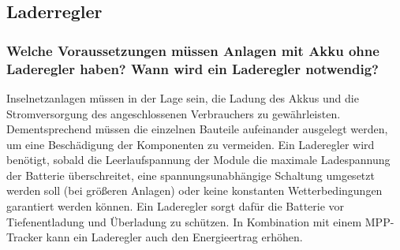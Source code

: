 \subsection{Laderregler}
\subsubsection{Welche Voraussetzungen müssen Anlagen mit Akku ohne Laderegler haben? Wann wird ein Laderegler notwendig?}
Inselnetzanlagen müssen in der Lage sein, die Ladung des Akkus und die Stromversorgung des angeschlossenen Verbrauchers zu gewährleisten. Dementsprechend müssen die einzelnen Bauteile aufeinander ausgelegt werden, um eine Beschädigung der Komponenten zu vermeiden. Ein Laderegler wird benötigt, sobald die Leerlaufspannung der Module die maximale Ladespannung der Batterie überschreitet, eine spannungsunabhängige Schaltung umgesetzt werden soll (bei größeren Anlagen) oder keine konstanten Wetterbedingungen garantiert werden können. Ein Laderegler sorgt dafür die Batterie vor Tiefenentladung und Überladung zu schützen. In Kombination mit einem MPP-Tracker kann ein Laderegler auch den Energieertrag erhöhen. 

